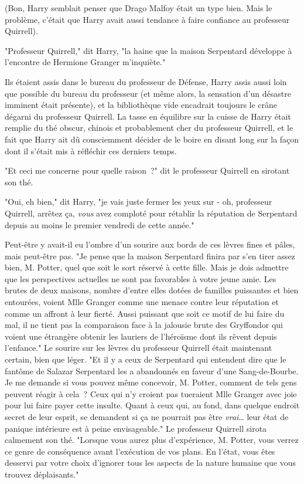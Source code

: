 (Bon, Harry semblait penser que Drago Malfoy était un type bien. Mais le problème, c'était que Harry avait aussi tendance à faire confiance au professeur Quirrell).

\later

"Professeur Quirrell," dit Harry, "la haine que la maison Serpentard développe à l'encontre de Hermione Granger m'inquiète."

Ils étaient assis dans le bureau du professeur de Défense, Harry assis aussi loin que possible du bureau du professeur (et même alors, la sensation d'un désastre imminent était présente), et la bibliothèque vide encadrait toujours le crâne dégarni du professeur Quirrell. La tasse en équilibre sur la cuisse de Harry était remplie du thé obscur, chinois et probablement cher du professeur Quirrell, et le fait que Harry ait dû consciemment décider de le boire en disant long sur la façon dont il s'était mis à réfléchir ces derniers temps.

"Et ceci me concerne pour quelle raison~?" dit le professeur Quirrell en sirotant son thé.

"Oui, eh bien," dit Harry, "je vais juste fermer les yeux sur - oh, professeur Quirrell, arrêtez ça, \emph{vous} avez comploté pour rétablir la réputation de Serpentard depuis au moins le premier vendredi de cette année."

Peut-être y avait-il eu l'ombre d'un sourire aux bords de ces lèvres fines et pâles, mais peut-être pas. "Je pense que la maison Serpentard finira par s'en tirer assez bien, M. Potter, quel que soit le sort réservé à cette fille. Mais je dois admettre que les perspectives actuelles ne sont pas favorables à votre jeune amie. Les brutes de deux maisons, nombre d'entre elles dotées de familles puissantes et bien entourées, voient Mlle Granger comme une menace contre leur réputation et comme un affront à leur fierté. Aussi puissant que soit ce motif de lui faire du mal, il ne tient pas la comparaison face à la jalousie brute des Gryffondor qui voient une étrangère obtenir les lauriers de l'héroïsme dont ils rêvent depuis l'enfance." Le sourire sur les lèvres du professeur Quirrell était maintenant certain, bien que léger. "Et il y a ceux de Serpentard qui entendent dire que le fantôme de Salazar Serpentard les a abandonnés en faveur d'une Sang-de-Bourbe. Je me demande si vous pouvez même concevoir, M. Potter, comment de tels gens peuvent réagir à cela~? Ceux qui n'y croient pas tueraient Mlle Granger avec joie pour lui faire payer cette insulte. Quant à ceux qui, au fond, dans quelque endroit secret de leur esprit, se demandent si ça ne pourrait pas être \emph{vrai}… leur état de panique intérieure est à peine envisageable." Le professeur Quirrell sirota calmement son thé. "Lorsque vous aurez plus d'expérience, M. Potter, vous verrez ce genre de conséquence avant l'exécution de vos plans. En l'état, vous êtes desservi par votre choix d'ignorer tous les aspects de la nature humaine que vous trouvez déplaisants."

